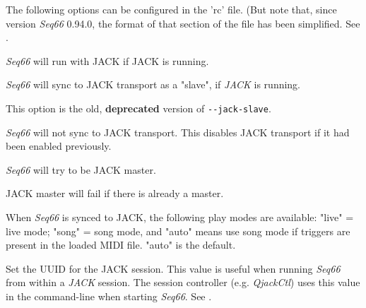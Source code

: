    The following options can be configured in the 'rc' file. (But note that,
   since version \textsl{Seq66} 0.94.0, the format of that section of the file
   has been simplified.
   See .

      \textsl{Seq66} will run with JACK if JACK is running.


      \textsl{Seq66} will sync to JACK transport as a "slave", if \textsl{JACK}
      is running.

      This option is the old, \textbf{deprecated} version of
      \texttt{-{}-jack-slave}.


      \textsl{Seq66} will not sync to JACK transport.
      This disables JACK transport if it had been enabled previously.


      \textsl{Seq66} will try to be JACK master.


      JACK master will fail if there is already a master.


      When \textsl{Seq66} is synced to JACK, the following play modes
      are available: "live" = live mode; "song" = song mode, and "auto" means
      use song mode if triggers are present in the loaded MIDI file. "auto" is
      the default.


      Set the UUID for the JACK session.  This value is useful when
      running \textsl{Seq66} from within a \textsl{JACK} session.
      The session controller (e.g. \textsl{QjackCtl}) uses this value in the
      command-line when starting \textsl{Seq66}.
      See .

